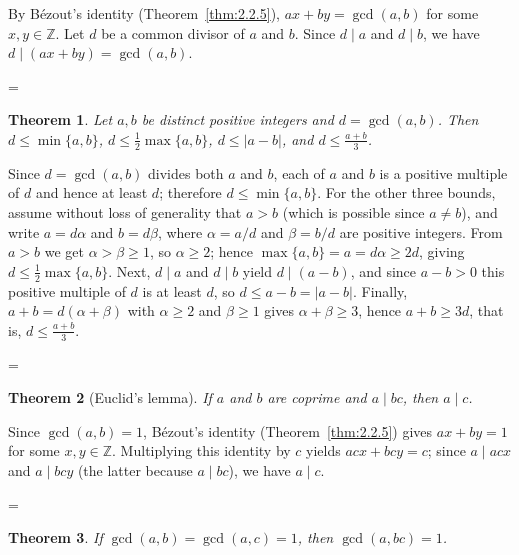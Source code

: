 \documentclass[11pt]{article}
\makeatletter
\theoremstyle{ntstyle}
\newtheorem{theorem}{Theorem}[subsection]
\let\nt@closedisplay\]
\def\nt@guardedclose{\@ifnextchar\par{\nt@closeafterpar}{\@ifnextchar\end{\postdisplaypenalty\@M\nt@closedisplay}{\nt@closedisplay}}}
\def\nt@closeafterpar\par{\@ifnextchar\par{\nt@closeafterpar}{\@ifnextchar\end{\postdisplaypenalty\@M\nt@closedisplay\par}{\nt@closedisplay\par}}}
\renewenvironment{proof}[1][\proofname]{\par
  \pushQED{\qed}\normalfont\topsep\medskipamount\edef\nt@afterproof{\@endparpenalty=\the\@endparpenalty\relax}\@beginparpenalty\@M\@endparpenalty\@M\let\]\nt@guardedclose\trivlist\item[]\textit{#1\@addpunct{.}} \ignorespaces}{\ifvmode\addpenalty\@M\fi\popQED\nt@afterproof\endtrivlist\@endpefalse}
\makeatother
\begin{document}
\begin{proof} By B{\'e}zout's identity (Theorem~\ref{thm:2.2.5}), $ax+by = \gcd(a, b)$ for some $x, y \in
		\mathbb{Z}$. Let $d$ be a common
	divisor of $a$ and $b$. Since $d \mid a$ and $d \mid b$, we have $d
		\mid (ax+by) = \gcd(a, b)$.

\end{proof}
\begin{theorem}\label{thm:2.2.7} Let $a,b$ be distinct positive integers and
	$d=\gcd(a, b)$. Then $d\le\min\{a, b\}$, $d\le\tfrac{1}{2}\max\{a, b\}$,
	$d\le|a-b|$, and $d\le\tfrac{a+b}{3}$.

\end{theorem}

\begin{proof} Since $d=\gcd(a, b)$ divides both $a$ and
	$b$, each of $a$ and $b$ is a positive multiple of $d$ and hence at least
		$d$; therefore $d\le\min\{a, b\}$. For the other three bounds, assume
	without loss of generality that $a>b$ (which is possible since $a\neq b$), and
	write $a=d\alpha$ and $b=d\beta$, where $\alpha=a/d$ and
	$\beta=b/d$ are positive integers. From $a>b$ we get
	$\alpha>\beta\ge1$, so $\alpha\ge2$; hence
	$\max\{a, b\}=a=d\alpha\ge2d$, giving $d\le\tfrac{1}{2}\max\{a, b\}$. Next,
	$d\mid a$ and $d\mid b$ yield $d\mid(a-b)$, and since
	$a-b>0$ this positive multiple of $d$ is at least $d$, so $d\le
		a-b=|a-b|$. Finally, $a+b=d(\alpha+\beta)$ with $\alpha\ge2$ and
	$\beta\ge1$ gives $\alpha+\beta\ge3$, hence $a+b\ge3d$, that is, $d\le\tfrac{a+b}{3}$.

\end{proof}
\begin{theorem}[Euclid's lemma]\label{thm:2.2.8} If $a$ and $b$ are coprime and
	$a \mid bc$, then $a \mid c$.

\end{theorem}

\begin{proof} Since $\gcd(a, b) = 1$, B{\'e}zout's identity (Theorem~\ref{thm:2.2.5})
	gives $ax + by = 1$ for some $x, y \in \mathbb{Z}$.
	Multiplying this identity by $c$ yields $acx+bcy=c$; since $a \mid acx$ and $a
		\mid bcy$ (the latter because $a \mid bc$), we have $a \mid c$.

\end{proof}
\begin{theorem}\label{thm:2.2.9} If $\gcd(a, b) = \gcd(a, c) = 1$,
	then $\gcd(a, bc)=1$.

\end{theorem}
\end{document}
